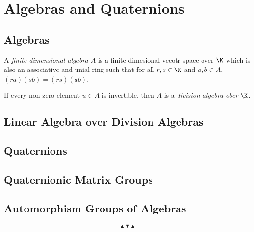 \chapter{Algebras and Quaternions}

\section{Algebras}

\begin{definition}
  A {\it finite dimensional algebra \(A\)} is a finite dimesional vecotr space over \(\K\)
  which is also an associative and unial ring such that for all \(r,s\in\K\) and
  \(a,b\in A\), \((ra)(sb)=(rs)(ab)\).
\end{definition}

If every non-zero element \(u\in A\) is invertible, then \(A\) is a {\it division algebra ober \(\K\)}.

\section{Linear Algebra over Division Algebras}

\section{Quaternions}

\section{Quaternionic Matrix Groups}

\section{Automorphism Groups of Algebras}

\[ \blacktriangle \blacktriangledown \blacktriangle \]
